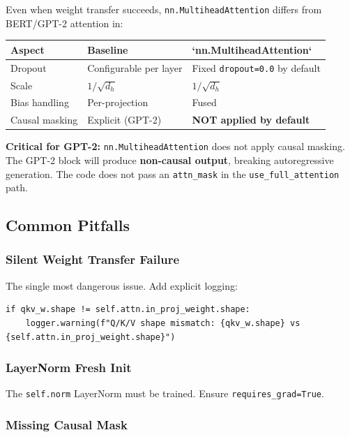 Even when weight transfer succeeds, \texttt{nn.MultiheadAttention} differs from 
BERT/GPT-2 attention in:

\begin{table}[H]
\centering
\small
\begin{tabular}{lll}
\toprule
\textbf{Aspect} & \textbf{Baseline} & \textbf{`nn.MultiheadAttention`} \\
\midrule
Dropout & Configurable per layer & Fixed \texttt{dropout=0.0} by default \\
Scale & $1/\sqrt{d_h}$ & $1/\sqrt{d_h}$ \\
Bias handling & Per-projection & Fused \\
Causal masking & Explicit (GPT-2) & \textbf{NOT applied by default} \\
\bottomrule
\end{tabular}
\end{table}

\textbf{Critical for GPT-2:} \texttt{nn.MultiheadAttention} does not apply causal masking. 
The GPT-2 block will produce \textbf{non-causal output}, breaking autoregressive 
generation. The code does not pass an \texttt{attn\_mask} in the \texttt{use\_full\_attention} 
path.

\subsection{Common Pitfalls}

\subsubsection{Silent Weight Transfer Failure}

The single most dangerous issue. Add explicit logging:

\begin{lstlisting}
if qkv_w.shape != self.attn.in_proj_weight.shape:
    logger.warning(f"Q/K/V shape mismatch: {qkv_w.shape} vs {self.attn.in_proj_weight.shape}")
\end{lstlisting}

\subsubsection{LayerNorm Fresh Init}

The \texttt{self.norm} LayerNorm must be trained. Ensure \texttt{requires\_grad=True}.

\subsubsection{Missing Causal Mask}

